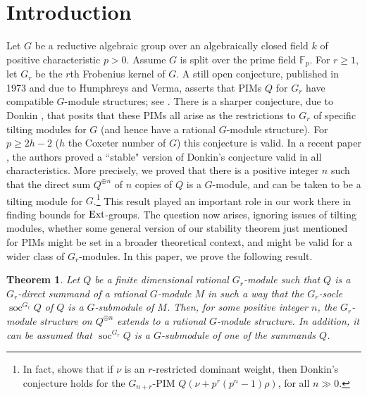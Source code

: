 \documentclass[11pt,leqno,amscd,amssymb,verbatim, url]{amsart}
\newtheorem{thm}{Theorem}[section]%
\theoremstyle{definition}
\numberwithin{equation}{thm}
\newcommand{\Ext}{{\text{\rm Ext}}}
\newcommand{\soc}{\operatorname{soc}}
\begin{document}
\section{Introduction}
Let $G$ be a reductive algebraic group over an algebraically closed field $k$ of positive
characteristic $p>0$. Assume $G$ is split over the prime field ${\mathbb F}_p$. For $r\geq1$, let $G_r$ be the  $r$th Frobenius kernel of $G$.
A still open conjecture, published in 1973 and due to Humphreys and Verma, asserts that PIMs  $Q$ for $G_r$ have compatible $G$-module structures; see \cite[p. 325]{Jan}. There is  a sharper conjecture, due to Donkin \cite{Donkin2},
that posits that these PIMs all arise as the restrictions to $G_r$ of specific tilting modules for $G$ (and hence have
a rational $G$-module structure). For $p\geq 2h-2$ ($h$ the Coxeter number of $G$) this
conjecture is valid. In a recent paper \cite{PS}, the authors proved a ``stable" version of Donkin's conjecture
valid in all characteristics.  More precisely, we proved that there is a positive integer $n$ such that the direct
sum $Q^{\oplus n}$ of $n$ copies of $Q$ is a $G$-module, and can be taken to be a tilting module for $G$.\footnote{In fact,
 \cite{PS} shows that if $\nu$ is an $r$-restricted dominant weight, then Donkin's conjecture holds for the $G_{n+r}$-PIM $Q(\nu+p^r(p^n-1)\rho)$, for all $n\gg 0$.
 } This result played an important role in our work there in finding bounds
for $\Ext$-groups.  The question now arises, ignoring issues of tilting modules,
whether some general version of our stability theorem just mentioned for PIMs might be set in a broader theoretical context, and
might be valid for a wider class of $G_r$-modules. In this paper, we prove the following result.


\begin{thm}\label{MainTheorem}  Let $Q$ be a finite dimensional rational $G_r$-module such that
 $Q$ is a $G_r$-direct summand
of a rational $G$-module $M$ in such a way that the $G_r$-socle $\soc^{G_r}Q$ of $Q$ is a $G$-submodule of $M$.
Then, for some positive integer $n$, the $G_r$-module structure on
$Q^{\oplus n}$ extends to a rational $G$-module structure.  In addition, it can be assumed that $\soc^{G_r}Q$
is a $G$-submodule of one of the summands $Q$. \end{thm}
\end{document}
